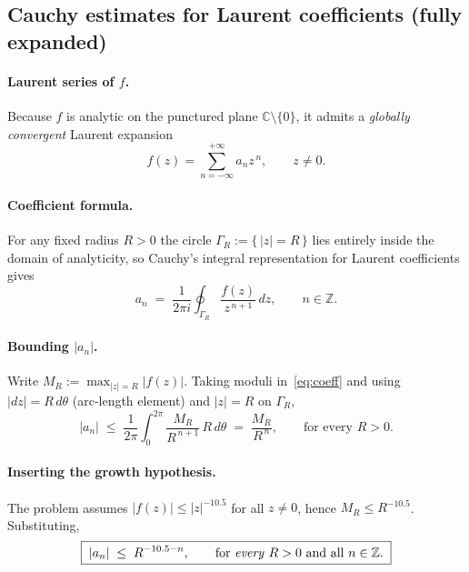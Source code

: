 \documentclass[12pt]{article}
\theoremstyle{definition} %
\theoremstyle{plain} %
\begin{document}
\subsection*{Cauchy estimates for Laurent coefficients (fully expanded)}

\paragraph{ Laurent series of $f$.}
Because $f$ is analytic on the punctured plane $\mathbb{C}\setminus\{0\}$,
it admits a \emph{globally convergent} Laurent expansion  
\[
   f(z)=\sum_{n=-\infty}^{+\infty} a_n z^{\,n},
   \qquad z\neq 0.
\]

\paragraph{Coefficient formula.}
For any fixed radius $R>0$ the circle $\Gamma_R:=\{\,|z|=R\,\}$
lies entirely inside the domain of analyticity,
so Cauchy’s integral representation for Laurent coefficients gives  
\begin{equation}\label{eq:coeff}
   a_n
   \;=\;
   \frac{1}{2\pi i}
   \oint_{\Gamma_R}
      \frac{f(z)}{z^{\,n+1}}\,
   dz,
   \qquad n\in\mathbb{Z} .
\end{equation}

\paragraph{Bounding $|a_n|$.}
Write $M_R:=\max_{|z|=R} |f(z)|$.
Taking moduli in~\eqref{eq:coeff} and using
$|dz|=R\,d\theta$ (arc‑length element) and $|z|=R$ on $\Gamma_R$,
\[
   |a_n|
   \;\le\;
   \frac{1}{2\pi}
   \int_{0}^{2\pi}
      \frac{M_R}{R^{\,n+1}}\,
      R\,d\theta
   \;=\;
   \frac{M_R}{R^{\,n}},
   \qquad\text{for every }R>0.
\]

\paragraph{Inserting the growth hypothesis.}
The problem assumes $|f(z)|\le |z|^{-10.5}$ for all $z\neq 0$,
hence $M_R\le R^{-10.5}$.
Substituting,
\[
   \boxed{\;
      |a_n|
      \;\le\;
      R^{-10.5-n},
      \qquad\text{for \emph{every} }R>0\text{ and all }n\in\mathbb{Z}.
   \;}
\]
\end{document}
